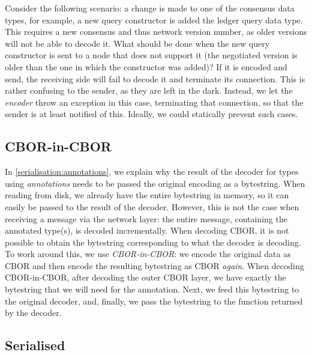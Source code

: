 Consider the following scenario: a change is made to one of the consensus data
types, for example, a new query constructor is added the ledger query data type.
This requires a new consensus and thus network version number, as older versions
will not be able to decode it. What should be done when the new query
constructor is sent to a node that does not support it (the negotiated version
is older than the one in which the constructor was added)? If it is encoded and
send, the receiving side will fail to decode it and terminate its
connection. This is rather confusing to the sender, as they are
left in the dark. Instead, we let the \emph{encoder} throw an exception in this
case, terminating that connection, so that the sender is at least notified of
this.  Ideally, we could statically prevent such cases.

\subsection{CBOR-in-CBOR}
\label{serialisation:network:cbor-in-cbor}

In \cref{serialisation:annotations}, we explain why the result of the decoder
for types using \emph{annotations} needs to be passed the original encoding as a
bytestring. When reading from disk, we already have the entire bytestring in
memory, so it can easily be passed to the result of the
decoder. However, this is not the case when receiving a message via the network
layer: the entire message, containing the annotated type(s), is decoded
incrementally. When decoding CBOR, it is not possible to obtain the
bytestring corresponding to what the decoder is decoding. To work around this,
we use \emph{CBOR-in-CBOR}: we encode the original data as CBOR and then encode
the resulting bytestring as CBOR \emph{again}. When decoding CBOR-in-CBOR, after
decoding the outer CBOR layer, we have exactly the bytestring that we will need
for the annotation. Next, we feed this bytestring to the original decoder, and,
finally, we pass the bytestring to the function returned by the decoder.

\subsection{Serialised}
\label{serialisation:network:serialised}

